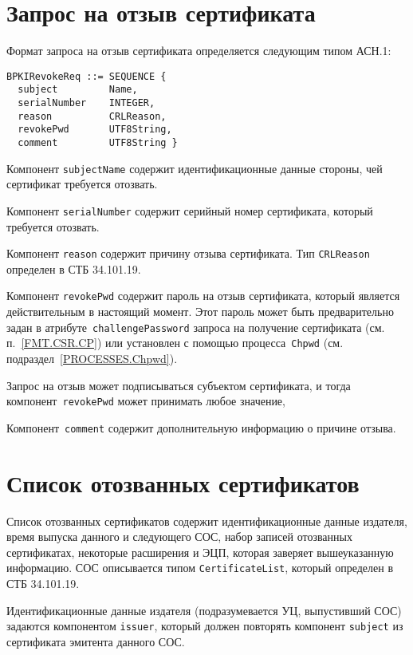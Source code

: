 \section{Запрос на отзыв сертификата}\label{FMT.BPKIRevokeReq}

Формат запроса на отзыв сертификата определяется следующим типом АСН.1:
\begin{verbatim}
BPKIRevokeReq ::= SEQUENCE {
  subject         Name,
  serialNumber    INTEGER,
  reason          CRLReason,
  revokePwd       UTF8String,
  comment         UTF8String }
\end{verbatim}

Компонент \texttt{subjectName} содержит идентификационные 
данные стороны, чей сертификат требуется отозвать. 

Компонент \texttt{serialNumber} содержит серийный номер 
сертификата, который требуется отозвать.

Компонент \texttt{reason} содержит причину отзыва сертификата. 
Тип \texttt{CRLReason} определен в СТБ 34.101.19.

Компонент \texttt{revokePwd} содержит пароль на отзыв 
сертификата, который является действительным в 
настоящий момент. Этот пароль может быть предварительно
задан в атрибуте~\texttt{challengePassword} запроса на получение 
сертификата (см. п.~\ref{FMT.CSR.CP}) или установлен с помощью 
процесса~\texttt{Chpwd} (см. подраздел~\ref{PROCESSES.Chpwd}).

Запрос на отзыв может подписываться субъектом сертификата,
и тогда компонент~\texttt{revokePwd} может принимать любое значение,

Компонент~\texttt{comment} содержит дополнительную информацию 
о причине отзыва.
 
\section{Список отозванных сертификатов}\label{FMT.CRL}

Список отозванных сертификатов содержит идентификационные данные 
издателя, время выпуска данного и следующего СОС, набор 
записей отозванных сертификатах, некоторые расширения и ЭЦП, 
которая заверяет вышеуказанную информацию. СОС описывается типом 
\texttt{CertificateList}, который определен в СТБ 34.101.19.
 
Идентификационные данные издателя (подразумевается УЦ, 
выпустивший СОС) задаются компонентом \texttt{issuer}, 
который должен повторять компонент \texttt{subject} из 
сертификата эмитента данного СОС.  

